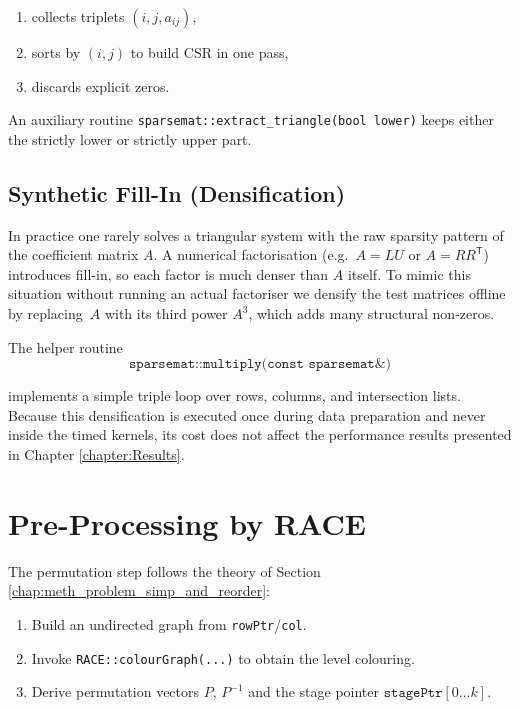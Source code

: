 \begin{enumerate}
  \item collects triplets $(i,j,a_{ij})$,
  \item sorts by $(i,j)$ to build CSR in one pass,
  \item discards explicit zeros.
\end{enumerate}

An auxiliary routine
\texttt{sparsemat::extract\_triangle(bool lower)} keeps
either the strictly lower or strictly upper part.

\subsection{Synthetic Fill-In (Densification)}
\label{sec:synthetic_fillin}

In practice one rarely solves a triangular system with the raw sparsity pattern of the coefficient matrix $A$.
A numerical factorisation (e.g.\ $A = LU$ or $A =RR^{\mathsf T}$) introduces fill-in, so each factor is much denser than $A$ itself. To mimic this situation without running an actual factoriser we densify the test matrices offline by replacing~$A$ with its third power $A^{3}$, which adds many structural non-zeros.

The helper routine
$$
  \texttt{sparsemat::multiply(const sparsemat\&)}  
$$

implements a simple triple loop over rows, columns, and
intersection lists. Because this densification is executed once during data preparation and never inside the timed kernels, its cost does not affect the performance results presented in Chapter \ref{chapter:Results}.

\section{Pre-Processing by RACE}
\label{sec:impl_preproc}

The permutation step follows the theory of
Section \ref{chap:meth_problem_simp_and_reorder}:

\begin{enumerate}
  \item Build an undirected graph from \texttt{rowPtr}/\texttt{col}.
  \item Invoke \texttt{RACE::colourGraph(...)} to obtain the
        level colouring.
  \item Derive permutation vectors  
        $P$, $P^{-1}$ and the stage pointer
        $\texttt{stagePtr}[0\ldots k]$.
\end{enumerate}

